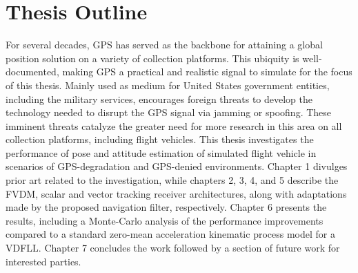 \section{\textbf{Thesis Outline}}
For several decades, GPS has served as the backbone for attaining a global position solution on a variety of collection platforms. This ubiquity is well-documented, making GPS a practical and realistic signal to simulate for the focus of this thesis. Mainly used as medium for United States government entities, including the military services, encourages foreign threats to develop the technology needed to disrupt the GPS signal via jamming or spoofing. These imminent threats catalyze the greater need for more research in this area on all collection platforms, including flight vehicles.
This thesis investigates the performance of pose and attitude estimation of simulated flight vehicle in scenarios of GPS-degradation and GPS-denied environments. Chapter 1 divulges prior art related to the investigation, while chapters 2, 3, 4, and 5 describe the FVDM, scalar and vector tracking receiver architectures, along with adaptations made by the proposed navigation filter, respectively. Chapter 6 presents the results, including a Monte-Carlo analysis of the performance improvements compared to a standard zero-mean acceleration kinematic process model for a VDFLL\@. Chapter 7 concludes the work followed by a section of future work for interested parties.

